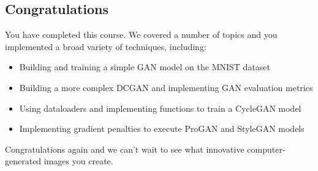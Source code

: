 \subsection{Congratulations}
You have completed this course. We covered a number of topics and you implemented a broad variety of techniques, including:

\begin{itemize}
    \item Building and training a simple GAN model on the MNIST dataset
    \item Building a more complex DCGAN and implementing GAN evaluation metrics
    \item Using dataloaders and implementing functions to train a CycleGAN model
    \item Implementing gradient penalties to execute ProGAN and StyleGAN models
\end{itemize}
Congratulations again and we can't wait to see what innovative computer-generated images you create.
